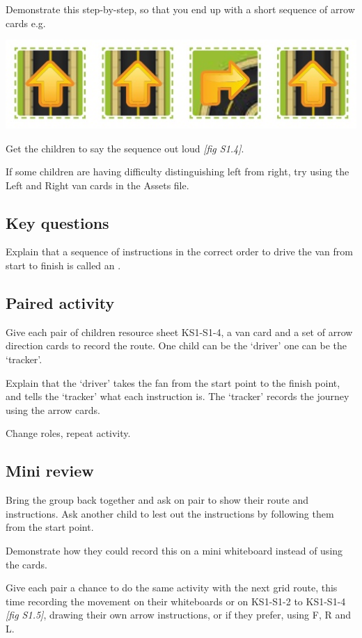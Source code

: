 \documentclass{../../../lessonplan}
\begin{document}
\begin{lessonplan}
Demonstrate this step-by-step, so that you end up with a short sequence of arrow cards e.g.\

\includegraphics[width=.667\linewidth]{arrow_cards.jpg}

Get the children to say the sequence out loud \textit{[fig S1.4]}.  

If some children are having difficulty distinguishing left from right, try using the Left and Right van cards in the Assets file.


\subsection*{Key questions}



Explain that a sequence of instructions in the correct order to drive the van from start to finish is called an .


\subsection*{Paired activity}

Give each pair of children resource sheet KS1-S1-4, a van card and a set of arrow direction cards to record the route.
One child can be the `driver' one can be the `tracker'.

Explain that the `driver' takes the fan from the start point to the finish point, and tells the `tracker' what each instruction is.
The `tracker' records the journey using the arrow cards.

Change roles, repeat activity.



\subsection*{Mini review}

Bring the group back together and ask on pair to show their route and instructions.
Ask another child to lest out the instructions by following them from the start point.

Demonstrate how they could record this on a mini whiteboard instead of using the cards.

Give each pair a chance to do the same activity with the next grid route, this time recording the movement on their whiteboards or on KS1-S1-2 to KS1-S1-4 \textit{[fig S1.5]}, drawing their own arrow instructions, or if they prefer, using F, R and L.


\end{lessonplan}
\end{document}
